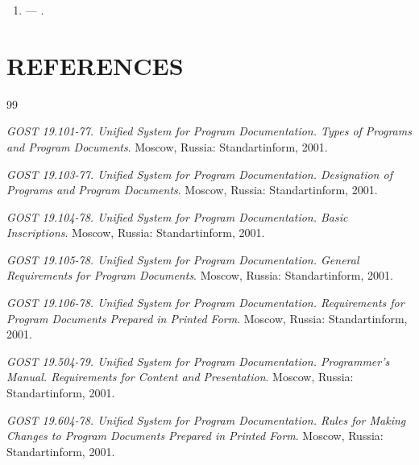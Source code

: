 \documentclass[12pt,a4paper]{extarticle}
\begin{document}
\begin{enumerate}[label=\arabic*., leftmargin=1.25cm]
  \item \textbf{} --- .
\end{enumerate}

\clearpage

\section*{REFERENCES}

\renewcommand{\refname}{}
\begin{thebibliography}{99}
\vspace{-1cm}

\emph{GOST 19.101-77. Unified System for Program Documentation. Types of Programs and Program Documents}. Moscow, Russia: Standartinform, 2001.

\emph{GOST 19.103-77. Unified System for Program Documentation. Designation of Programs and Program Documents}. Moscow, Russia: Standartinform, 2001.

\emph{GOST 19.104-78. Unified System for Program Documentation. Basic Inscriptions}. Moscow, Russia: Standartinform, 2001.

\emph{GOST 19.105-78. Unified System for Program Documentation. General Requirements for Program Documents}. Moscow, Russia: Standartinform, 2001.

\emph{GOST 19.106-78. Unified System for Program Documentation. Requirements for Program Documents Prepared in Printed Form}. Moscow, Russia: Standartinform, 2001.

\emph{GOST 19.504-79. Unified System for Program Documentation. Programmer's Manual. Requirements for Content and Presentation}. Moscow, Russia: Standartinform, 2001.

\emph{GOST 19.604-78. Unified System for Program Documentation. Rules for Making Changes to Program Documents Prepared in Printed Form}. Moscow, Russia: Standartinform, 2001.

\end{thebibliography}
\end{document}
